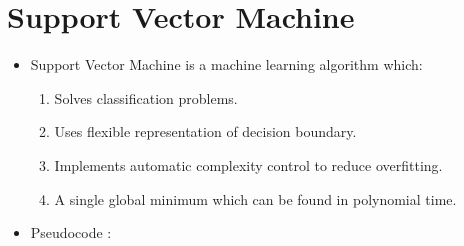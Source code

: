 \documentclass[a4paper,10pt]{article}
\begin{document}
\section{Support Vector Machine}

\begin{itemize}
	\item Support Vector Machine is a machine learning algorithm which:
	\begin{enumerate}
		\item Solves classification problems.
		\item Uses flexible representation of decision boundary.
		\item Implements automatic complexity control to reduce overfitting.
		\item A single global minimum which can be found in polynomial
		time.
	\end{enumerate}
\newpage
    \item  Pseudocode :
    

\end{itemize}
\end{document}
